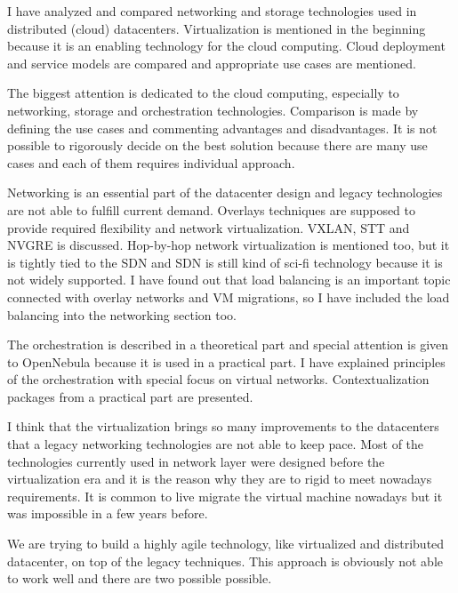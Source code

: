 
I have analyzed and compared networking and storage technologies used in distributed (cloud) datacenters. Virtualization is mentioned in the beginning because it is an enabling technology for the cloud computing. Cloud deployment and service models are compared and appropriate use cases are mentioned.

The biggest attention is dedicated to the cloud computing, especially to networking, storage and orchestration technologies. Comparison is made by defining the use cases and commenting advantages and disadvantages. It is not possible to rigorously decide on the best solution because there are many use cases and each of them requires individual approach.

Networking is an essential part of the datacenter design and legacy technologies are not able to fulfill current demand. Overlays techniques are supposed to provide required flexibility and network virtualization. \Ac{VXLAN}, \Ac{STT} and \Ac{NVGRE} is discussed. Hop-by-hop network virtualization is mentioned too, but it is tightly tied to the \Ac{SDN} and \Ac{SDN} is still kind of sci-fi technology because it is not widely supported.  
I have found out that load balancing is an important topic connected with overlay networks and \Ac{VM} migrations, so I have included the load balancing into the networking section too.


The orchestration is described in a theoretical part and special attention is given to OpenNebula because it is used in a practical part. I have explained principles of the orchestration with special focus on virtual networks. Contextualization packages from a practical part are presented.

I think that the virtualization brings so many improvements to the datacenters that a legacy networking technologies are not able to keep pace. Most of the technologies currently used in network layer were designed before the virtualization era and it is the reason why they are to rigid to meet nowadays requirements. It is common to live migrate the virtual machine nowadays but it was impossible in a few years before.

We are trying to build a highly agile technology, like virtualized and distributed datacenter, on top of the legacy techniques. This approach is obviously not able to work well and there are two possible possible. 

